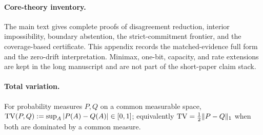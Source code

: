 
\paragraph{Core-theory inventory.}
The main text gives complete proofs of disagreement reduction, interior impossibility, boundary
abstention, the strict-commitment frontier, and the coverage-based certificate. This appendix records
the matched-evidence full form and the zero-drift interpretation. Minimax, one-bit, capacity, and
rate extensions are kept in the long manuscript and are not part of the short-paper claim stack.

\paragraph{Total variation.} For probability measures $P,Q$ on a common measurable space,
$\mathrm{TV}(P,Q):=\sup_A|P(A)-Q(A)|\in[0,1]$; equivalently $\mathrm{TV}=\tfrac12\|P-Q\|_1$ when both are dominated
by a common measure.

